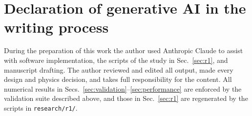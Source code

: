\documentclass[preprint,12pt]{elsarticle}
\begin{document}
\section*{Declaration of generative AI in the writing process}
During the preparation of this work the author used Anthropic Claude to assist with
software implementation, the scripts of the study in Sec.~\ref{sec:r1}, and manuscript
drafting. The author reviewed and edited all output, made every design and physics
decision, and takes full responsibility for the content. All numerical results in
Secs.~\ref{sec:validation}--\ref{sec:performance} are enforced by the validation suite
described above, and those in Sec.~\ref{sec:r1} are regenerated by the scripts in
\texttt{research/r1/}.



\end{document}
